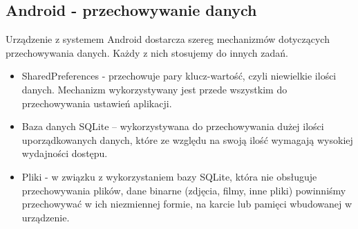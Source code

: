 \subsection{Android - przechowywanie danych}

Urządzenie z systemem Android dostarcza szereg mechanizmów dotyczących przechowywania danych. Każdy z nich stosujemy do innych zadań.

\begin{itemize}
\item SharedPreferences - przechowuje pary klucz-wartość, czyli niewielkie ilości danych. Mechanizm wykorzystywany jest przede wszystkim do przechowywania ustawień aplikacji.\cite{tutorial:sqlite}
\item Baza danych SQLite – wykorzystywana do przechowywania dużej ilości uporządkowanych danych, które ze względu na swoją ilość wymagają wysokiej wydajności dostępu.\cite{tutorial:sqlite}
\item Pliki - w związku z wykorzystaniem bazy SQLite, która nie obsługuje przechowywania plików, dane binarne (zdjęcia, filmy, inne pliki) powinniśmy przechowywać w ich niezmiennej formie, na karcie lub pamięci wbudowanej w urządzenie.\cite{tutorial:sqlite}
\end{itemize}









